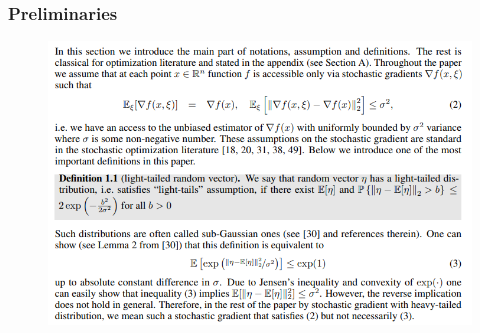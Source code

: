 \begin{frame}
    \frametitle{Preliminaries}
    \begin{figure}[htpb]
        \begin{center}
            \includegraphics[width=0.9\linewidth]
                {pics/appendix/preliminaries}
        \end{center}
    \end{figure}
\end{frame}
